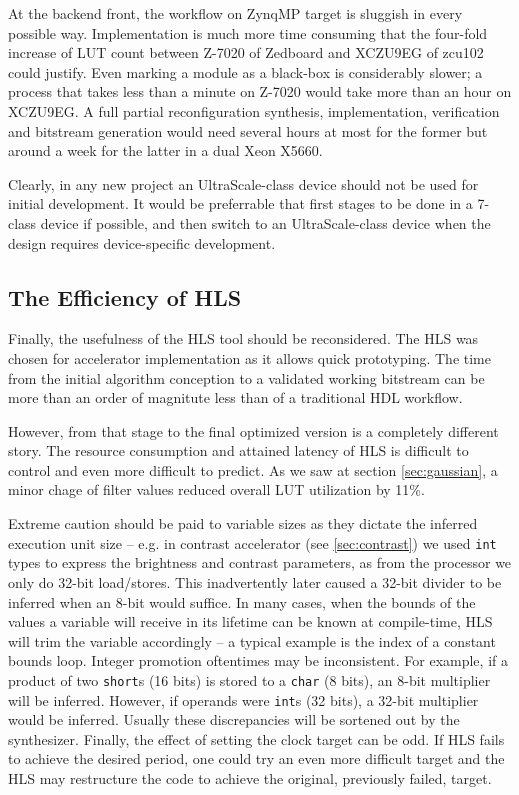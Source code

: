 At the backend front, the workflow on ZynqMP target is sluggish in every possible way. Implementation is much more time consuming
that the four-fold increase of LUT count between Z-7020 of Zedboard and XCZU9EG of zcu102 could justify. Even marking a module
as a black-box is considerably slower; a process that takes less than a minute on Z-7020 would take more than an hour on XCZU9EG.
A full partial reconfiguration synthesis, implementation, verification and bitstream generation would need several hours at most
for the former but around a week for the latter in a dual Xeon X5660. 

Clearly, in any new project an UltraScale-class device should not be used for initial development.
It would be preferrable that first stages to be done in a 7-class device if possible,
and then switch to an UltraScale-class device when the design requires device-specific development.

\subsection{The Efficiency of HLS}

Finally, the usefulness of the HLS tool should be reconsidered. The HLS was chosen for accelerator implementation as it
allows quick prototyping.
The time from the initial algorithm conception to a validated working bitstream can be more than an order
of magnitute less than of a traditional HDL workflow. 

However, from that stage to the final optimized version is a completely different story.
The resource consumption and attained latency of HLS is difficult to control and even more difficult to predict.
As we saw at section \ref{sec:gaussian}, a minor chage of filter values reduced overall LUT utilization by 11\%.

Extreme caution should be paid to variable sizes as they dictate the inferred execution unit size -- e.g.
in contrast accelerator (see \ref{sec:contrast}) we used \texttt{int} types to express the brightness and contrast parameters, 
as from the processor we only do 32-bit load/stores.
This inadvertently later caused a 32-bit divider to be inferred when an 8-bit would suffice. In many cases, when the bounds of the values
a variable will receive in its lifetime can be known at compile-time, HLS will trim the variable accordingly -- a typical example
is the index of a constant bounds loop. Integer promotion oftentimes may be inconsistent.
For example, if a product of two \texttt{short}s (16 bits) is stored to a \texttt{char} (8 bits), an 8-bit multiplier will be inferred.
However, if operands were \texttt{int}s (32 bits), a 32-bit multiplier would be inferred. Usually these discrepancies will be sortened out
by the synthesizer. Finally, the effect of setting the clock target can be odd. If HLS fails to achieve the desired period,
one could try an even more difficult target and the HLS may restructure the code to achieve the original, previously failed, target.

